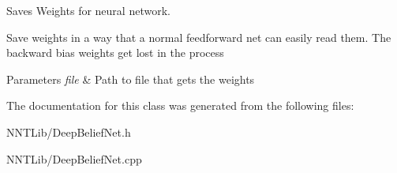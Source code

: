 Saves Weights for neural network. 

Save weights in a way that a normal feedforward net can easily read them. The backward bias weights get lost in the process


\begin{DoxyParams}{Parameters}
{\em file} & Path to file that gets the weights \\
\hline
\end{DoxyParams}


The documentation for this class was generated from the following files\+:\begin{DoxyCompactItemize}
\item 
N\+N\+T\+Lib/Deep\+Belief\+Net.\+h\item 
N\+N\+T\+Lib/Deep\+Belief\+Net.\+cpp\end{DoxyCompactItemize}
